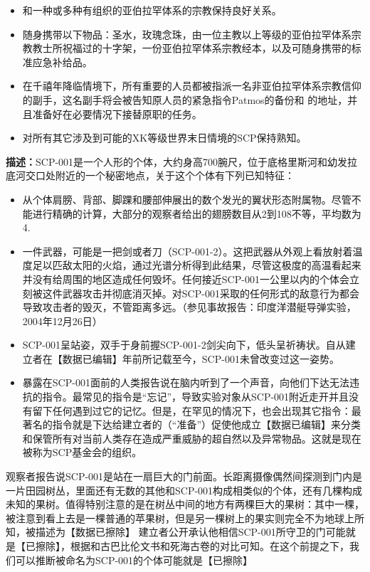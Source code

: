 \documentclass[openany,a4paper]{book} %
\begin{document}
\begin{itemize}
  \item 和一种或多种有组织的亚伯拉罕体系的宗教保持良好关系。
  \item 随身携带以下物品：圣水，玫瑰念珠，由一位主教以上等级的亚伯拉罕体系宗教教士所祝福过的十字架，一份亚伯拉罕体系宗教经本，以及可随身携带的标准应急补给品。
  \item 在千禧年降临情境下，所有重要的人员都被指派一名非亚伯拉罕体系宗教信仰的副手，这名副手将会被告知原人员的紧急指令Patmos的备份和 的地址，并且准备好在必要情况下接替原职的任务。
  \item 对所有其它涉及到可能的XK等级世界末日情境的SCP保持熟知。
\end{itemize}

\textbf{描述：}SCP-001是一个人形的个体，大约身高700腕尺，位于底格里斯河和幼发拉底河交口处附近的一个秘密地点，关于这个个体有下列已知特征：

\begin{itemize}
  \item 从个体肩膀、背部、脚踝和腰部伸展出的数个发光的翼状形态附属物。尽管不能进行精确的计算，大部分的观察者给出的翅膀数目从2到108不等，平均数为4.
  \item 一件武器，可能是一把剑或者刀（SCP-001-2）。这把武器从外观上看放射着温度足以匹敌太阳的火焰，通过光谱分析得到此结果，尽管这极度的高温看起来并没有给周围的地区造成任何毁坏。任何接近SCP-001一公里以内的个体会立刻被这件武器攻击并彻底消灭掉。对SCP-001采取的任何形式的敌意行为都会导致攻击者的毁灭，不管距离多远。（参见事故报告：印度洋潜艇导弹实验，2004年12月26日）
  \item SCP-001呈站姿，双手于身前握SCP-001-2剑尖向下，低头呈祈祷状。自从建立者在【数据已编辑】年前所记载至今，SCP-001未曾改变过这一姿势。
  \item 暴露在SCP-001面前的人类报告说在脑内听到了一个声音，向他们下达无法违抗的指令。最常见的指令是“忘记”，导致实验对象从SCP-001附近走开并且没有留下任何遇到过它的记忆。但是，在罕见的情况下，也会出现其它指令：最著名的指令就是下达给建立者的（“准备”）促使他成立【数据已编辑】来分类和保管所有对当前人类存在造成严重威胁的超自然以及异常物品。这就是现在被称为SCP基金会的组织。
\end{itemize}

观察者报告说SCP-001是站在一扇巨大的门前面。长距离摄像偶然间探测到门内是一片田园树丛，里面还有无数的其他和SCP-001构成相类似的个体，还有几棵构成未知的果树。值得特别注意的是在树丛中间的地方有两棵巨大的果树：其中一棵，被注意到看上去是一棵普通的苹果树，但是另一棵树上的果实则完全不为地球上所知，被描述为【数据已擦除】
建立者公开承认他相信SCP-001所守卫的门可能就是【已擦除】，根据和古巴比伦文书和死海古卷的对比可知。在这个前提之下，我们可以推断被命名为SCP-001的个体可能就是【已擦除】
\end{document}
